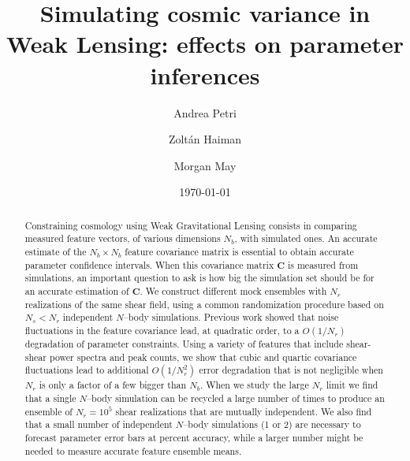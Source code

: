 \documentclass[reprint,aps,prd,superscriptaddress,showkeys,showpacs]{revtex4-1}
\newcommand{\bb}[1]{\mathbf{#1}}
\begin{document}
\title{Simulating cosmic variance in Weak Lensing: effects on parameter inferences}

\author{Andrea Petri}

\author{Zolt\'an Haiman}

\author{Morgan May}

\date{\today}

\label{firstpage}

\begin{abstract}

Constraining cosmology using Weak Gravitational Lensing consists in comparing measured feature vectors, of various dimensions $N_b$, with simulated ones. An accurate estimate of the $N_b\times N_b$ feature covariance matrix is essential to obtain accurate parameter confidence intervals. When this covariance matrix $\bb{C}$ is measured from simulations, an important question to ask is how big the simulation set should be for an accurate estimation of $\bb{C}$. We construct different mock ensembles with $N_r$ realizations of the same shear field, using a common randomization procedure based on $N_s<N_r$ independent $N$--body simulations. Previous work \citep{DodelsonSchneider13} showed that noise fluctuations in the feature covariance lead, at quadratic order, to a $O(1/N_r)$ degradation of parameter constraints. Using a variety of features that include shear-shear power spectra and peak counts, we show that cubic and quartic covariance fluctuations lead to additional $O(1/N_r^2)$ error degradation that is not negligible when $N_r$ is only a factor of a few bigger than $N_b$. When we study the large $N_r$ limit we find that a single $N$--body simulation can be recycled a large number of times to produce an ensemble of $N_r=10^5$ shear realizations that are mutually independent. We also find that a small number of independent $N$--body simulations (1 or 2) are necessary to forecast parameter error bars at percent accuracy, while a larger number might be needed to measure accurate feature ensemble means.

\end{abstract}


\end{document}

